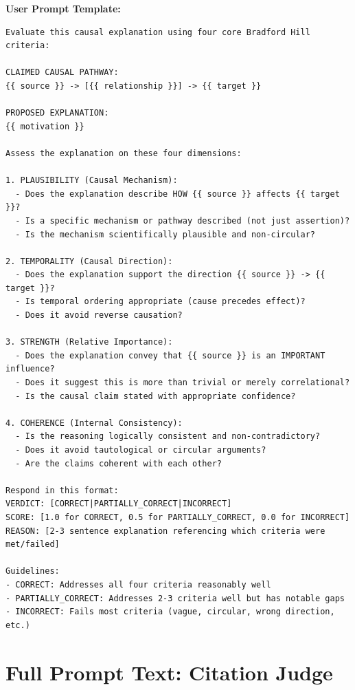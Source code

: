 \noindent\textbf{User Prompt Template:}
\begin{small}
\begin{verbatim}
Evaluate this causal explanation using four core Bradford Hill criteria:

CLAIMED CAUSAL PATHWAY:
{{ source }} -> [{{ relationship }}] -> {{ target }}

PROPOSED EXPLANATION:
{{ motivation }}

Assess the explanation on these four dimensions:

1. PLAUSIBILITY (Causal Mechanism):
  - Does the explanation describe HOW {{ source }} affects {{ target }}?
  - Is a specific mechanism or pathway described (not just assertion)?
  - Is the mechanism scientifically plausible and non-circular?

2. TEMPORALITY (Causal Direction):
  - Does the explanation support the direction {{ source }} -> {{ target }}?
  - Is temporal ordering appropriate (cause precedes effect)?
  - Does it avoid reverse causation?

3. STRENGTH (Relative Importance):
  - Does the explanation convey that {{ source }} is an IMPORTANT influence?
  - Does it suggest this is more than trivial or merely correlational?
  - Is the causal claim stated with appropriate confidence?

4. COHERENCE (Internal Consistency):
  - Is the reasoning logically consistent and non-contradictory?
  - Does it avoid tautological or circular arguments?
  - Are the claims coherent with each other?

Respond in this format:
VERDICT: [CORRECT|PARTIALLY_CORRECT|INCORRECT]
SCORE: [1.0 for CORRECT, 0.5 for PARTIALLY_CORRECT, 0.0 for INCORRECT]
REASON: [2-3 sentence explanation referencing which criteria were met/failed]

Guidelines:
- CORRECT: Addresses all four criteria reasonably well
- PARTIALLY_CORRECT: Addresses 2-3 criteria well but has notable gaps
- INCORRECT: Fails most criteria (vague, circular, wrong direction, etc.)
\end{verbatim}
\end{small}

\section{Full Prompt Text: Citation Judge}
\label{sec:citation_judge_prompt_text}

